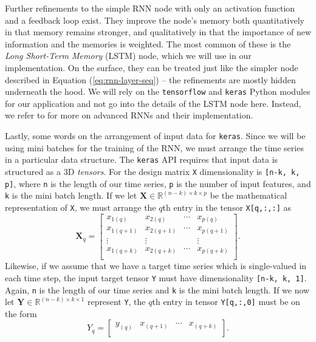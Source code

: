 \documentclass[]{article}
\begin{document}
Further refinements to the simple RNN node with only an activation function and a feedback loop exist. They improve the node's memory both quantitatively in that memory remains stronger, and qualitatively in that the importance of new information and the memories is weighted. The most common of these is the \textit{Long Short-Term Memory} (LSTM) node, which we will use in our implementation. On the surface, they can be treated just like the simpler node described in Equation (\ref{eq:rnn-layer-seq}) -- the refinements are mostly hidden underneath the hood. We will rely on the \lstinline|tensorflow| and \lstinline|keras| Python modules for our application and not go into the details of the LSTM node here. Instead, we refer to \cite{geron2019hands} for more on advanced RNNs and their implementation.

Lastly, some words on the arrangement of input data for \lstinline|keras|. Since we will be using mini batches for the training of the RNN, we must arrange the time series in a particular data structure. The \lstinline|keras| API requires that input data is structured as a 3D \textit{tensors}. For the design matrix \lstinline|X| dimensionality is \lstinline|[n-k, k, p]|, where \lstinline|n| is the length of our time series, \lstinline|p| is the number of input features, and \lstinline|k| is the mini batch length. If we let $\mathbf{X} \in \mathbb{R}^{(n-k) \times k \times p}$ be the mathematical representation of \lstinline|X|, we must arrange the $q$th entry in the tensor \lstinline|X[q,:,:]| as
\begin{equation} \label{eq:X-tensor}
\mathbf{X}_q = 
\left[ 
	\begin{array}{cccc}
		x_{1(q)}	&x_{2(q)}	&\cdots		&x_{p(q)}	\\
		x_{1(q+1)}	&x_{2(q+1)}	&\cdots		&x_{p(q+1)}	\\
		\vdots		&\vdots		&			&\vdots		\\
		x_{1(q+k)}	&x_{2(q+k)}	&\cdots		&x_{p(q+k)}	\\
	\end{array}
\right].
\end{equation}
Likewise, if we assume that we have a target time series which is single-valued in each time step, the input target tensor \lstinline|Y| must have dimensionality \lstinline|[n-k, k, 1]|. Again, \lstinline|n| is the length of our time series and \lstinline|k| is the mini batch length. If we now let $\mathbf{Y} \in \mathbb{R}^{(n-k) \times k \times 1}$ represent \lstinline|Y|, the $q$th entry in tensor \lstinline|Y[q,:,0]| must be on the form
\begin{equation} \label{eq:Y-tensor}
Y_q = 
\left[ 
	\begin{array}{cccc}
		y_{(q)}	&x_{(q+1)}	&\cdots		&x_{(q+k)}	\\
	\end{array}
\right].
\end{equation}
\end{document}
